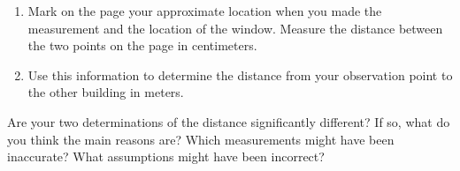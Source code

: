 \begin{enumerate}
\answerspace{1in}

\item Mark on the page your approximate location when you made the
measurement and the location of the window. Measure the distance between
the two points on the page in centimeters.

\answerspace{1in}

\pagebreak[3]
\item Use this information to determine the distance from your
observation point to the other building in meters.

\answerspace{1in}

\end{enumerate}

Are your two determinations of the distance significantly
different?  If so, what do you think the main reasons are?  Which
measurements might have been inaccurate?  What assumptions might
have been incorrect?

\answerspace{2in}

%
%
%
%
%
%
%
%
%
%
%
%
%
%
